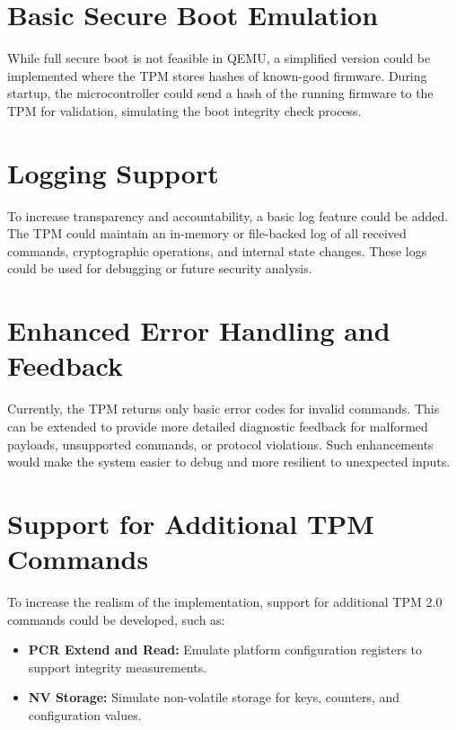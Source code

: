 \section{Basic Secure Boot Emulation}
While full secure boot is not feasible in QEMU, a simplified version could be implemented where the TPM stores hashes 
of known-good firmware. During startup, the microcontroller could send a hash of the running firmware 
to the TPM for validation, simulating the boot integrity check process.

\section{Logging Support}
To increase transparency and accountability, a basic log feature could be added. 
The TPM could maintain an in-memory or file-backed log of all received commands, 
cryptographic operations, and internal state changes. 
These logs could be used for debugging or future security analysis.

\section{Enhanced Error Handling and Feedback}
Currently, the TPM returns only basic error codes for invalid commands. 
This can be extended to provide more detailed diagnostic feedback for malformed payloads, 
unsupported commands, or protocol violations. 
Such enhancements would make the system easier to debug and more resilient to unexpected inputs.

\section{Support for Additional TPM Commands}
To increase the realism of the implementation, support for additional TPM 2.0 commands could be developed, such as:
\begin{itemize}
    \item \textbf{PCR Extend and Read:} Emulate platform configuration registers to support integrity measurements.
    \item \textbf{NV Storage:} Simulate non-volatile storage for keys, counters, and configuration values.
\end{itemize}

